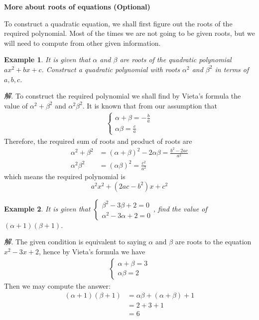 \documentclass[12pt]{article}
\newtheorem{example}{Example}
\begin{document}
    \begin{center}
        \textbf{More about roots of equations (Optional)}
    \end{center}

    To construct a quadratic equation, we shall first figure out the roots of the required polynomial. Most of the times we are not going to be given roots, but we will need to compute from other given information.

    \begin{example}
        It is given that $\alpha$ and $\beta$ are roots of the quadratic polynomial $ax^2+bx+c$. Construct a quadratic polynomial with roots $\alpha^2$ and $\beta^2$ in terms of $a,b,c$.
    \end{example}

    \textit{ 解.} To construct the required polynomial we shall find by Vieta's formula the value of $\alpha^2+\beta^2$ and $\alpha^2\beta^2$. It is known that from our assumption that \begin{align*}
        \begin{cases}
            \alpha+\beta=-\frac{b}{a}\\
            \alpha\beta=\frac{c}{a}
        \end{cases}
    \end{align*}
    Therefore, the required sum of roots and product of roots are \begin{align*}
        \alpha^2+\beta^2&=(\alpha+\beta)^2-2\alpha\beta=\frac{b^2-2ac}{a^2}\\
        \alpha^2\beta^2&=(\alpha\beta)^2=\frac{c^2}{a^2}
    \end{align*}
    which means the required polynomial is $$a^2x^2+(2ac-b^2)x+c^2$$

    \begin{example}
        It is given that $\begin{cases}
                \beta^2-3\beta+2=0\\
                \alpha^2-3\alpha+2=0
            \end{cases}$, find the value of $(\alpha+1)(\beta+1)$.
    \end{example}

    \textit{ 解.} The given condition is equivalent to saying $\alpha$ and $\beta$ are roots to the equation $x^2-3x+2$, hence by Vieta's formula we have \begin{align*}
        \begin{cases}
            \alpha+\beta=3\\
            \alpha\beta=2
        \end{cases}
    \end{align*}
    Then we may compute the answer:\begin{align*}
        (\alpha+1)(\beta+1)&=\alpha\beta+(\alpha+\beta)+1\\
        &=2+3+1\\
        &=6
    \end{align*}
\end{document}
